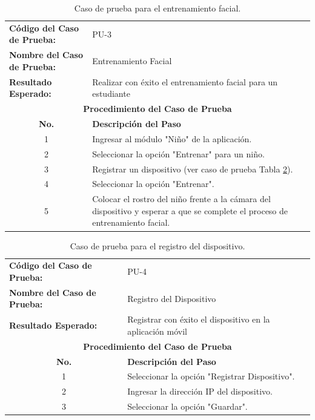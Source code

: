 				\begin{table}[hbt!]
					\centering
					\caption{Caso de prueba para el entrenamiento facial.}
					\label{tab:face-training-test-case}
					\begin{tabularx}{\textwidth}{l X}
						\toprule
						\textbf{Código del Caso de Prueba:} & PU-3 \\
						\textbf{Nombre del Caso de Prueba:} & Entrenamiento Facial \\
						\textbf{Resultado Esperado:} & Realizar con éxito el entrenamiento facial para un estudiante\\
						\midrule
						\multicolumn{2}{c}{\textbf{Procedimiento del Caso de Prueba}} \\
						\midrule
						\multicolumn{1}{c}{\textbf{No.}} & \textbf{Descripción del Paso} \\
						\midrule
						\multicolumn{1}{c}{1} & Ingresar al módulo "Niño" de la aplicación. \\
						\multicolumn{1}{c}{2} & Seleccionar la opción "Entrenar" para un niño. \\
						\multicolumn{1}{c}{3} & Registrar un dispositivo (ver caso de prueba Tabla \ref{tab:device-registration-test-case}). \\
						\multicolumn{1}{c}{4} & Seleccionar la opción "Entrenar". \\
						\multicolumn{1}{c}{5} & Colocar el rostro del niño frente a la cámara del dispositivo y esperar a que se complete el proceso de entrenamiento facial. \\
						\bottomrule
					\end{tabularx}
				\end{table}
				
				\begin{table}[hbt!]
					\centering
					\caption{Caso de prueba para el registro del dispositivo.}
					\label{tab:device-registration-test-case}
					\begin{tabularx}{\textwidth}{l X}
						\toprule
						\textbf{Código del Caso de Prueba:} & PU-4 \\
						\textbf{Nombre del Caso de Prueba:} & Registro del Dispositivo \\
						\textbf{Resultado Esperado:} & Registrar con éxito el dispositivo en la aplicación móvil \\
						\midrule
						\multicolumn{2}{c}{\textbf{Procedimiento del Caso de Prueba}} \\
						\midrule
						\multicolumn{1}{c}{\textbf{No.}} & \textbf{Descripción del Paso} \\
						\midrule
						\multicolumn{1}{c}{1} & Seleccionar la opción "Registrar Dispositivo". \\
						\multicolumn{1}{c}{2} & Ingresar la dirección IP del dispositivo. \\
						\multicolumn{1}{c}{3} & Seleccionar la opción "Guardar". \\
						\bottomrule
					\end{tabularx}
				\end{table}
				
